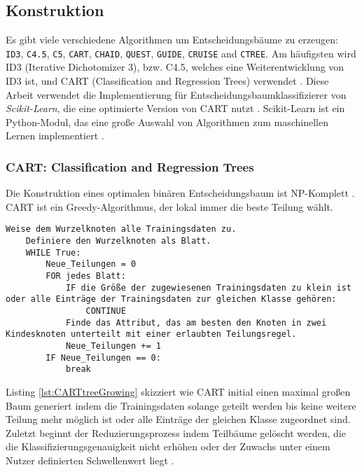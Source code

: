 \subsection{Konstruktion}
Es gibt viele verschiedene Algorithmen um Entscheidungsbäume zu erzeugen: \texttt{ID3}, \texttt{C4.5}, \texttt{C5}, \texttt{CART}, \texttt{CHAID}, \texttt{QUEST},
\texttt{GUIDE}, \texttt{CRUISE} and \texttt{CTREE}. Am häufigsten wird ID3 (Iterative Dichotomizer 3), bzw. C4.5, welches eine Weiterentwicklung von ID3 ist, und CART (Classification and Regression Trees) verwendet \cite{scikit-learn, singh2014comparative}.
Diese Arbeit verwendet die Implementierung für Entscheidungsbaumklassifizierer von \textit{Scikit-Learn}, die eine optimierte Version von CART nutzt \cite{ScikitLearnCART}. Scikit-Learn ist ein Python-Modul, das eine
große Auswahl von Algorithmen zum maschinellen Lernen implementiert \cite{scikit-learn}.

\subsubsection{CART: Classification and Regression Trees}
Die Konstruktion eines optimalen binären Entscheidungsbaum ist NP-Komplett \cite{laurent1976constructing}. CART ist ein Greedy-Algorithmus, der lokal immer die beste Teilung wählt.
\begin{lstlisting}[label=lst:CARTtreeGrowing,caption={Skizze von vereinfachten Baumwachstumsalgorithmus \cite{steinbergCART}.}]
    Weise dem Wurzelknoten alle Trainingsdaten zu.
    Definiere den Wurzelknoten als Blatt.
    WHILE True:
        Neue_Teilungen = 0
        FOR jedes Blatt:
            IF die Größe der zugewiesenen Trainingsdaten zu klein ist oder alle Einträge der Trainingsdaten zur gleichen Klasse gehören:
                CONTINUE
            Finde das Attribut, das am besten den Knoten in zwei Kindesknoten unterteilt mit einer erlaubten Teilungsregel.
            Neue_Teilungen += 1
        IF Neue_Teilungen == 0:
            break
\end{lstlisting}
Listing \ref{lst:CARTtreeGrowing} skizziert wie CART initial einen maximal großen Baum generiert indem die Trainingsdaten solange geteilt werden bis keine weitere Teilung mehr möglich ist oder alle Einträge der gleichen
Klasse zugeordnet sind. Zuletzt beginnt der Reduzierungsprozess indem Teilbäume gelöscht werden, die die Klassifizierungsgenauigkeit nicht erhöhen oder der Zuwachs unter einem Nutzer definierten
Schwellenwert liegt \cite{steinbergCART}.
